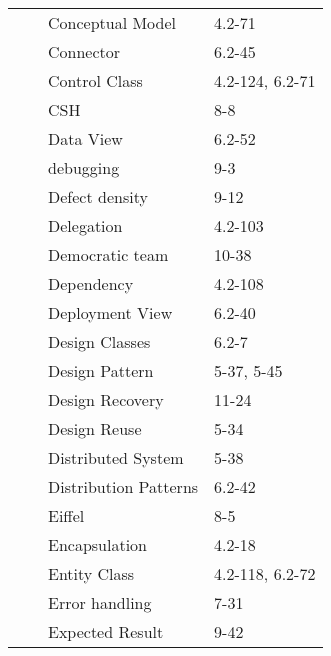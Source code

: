 \documentclass[twocolumn]{article}
\begin{document}
\begin{tabular}{ | >{\bfseries}m{0.5em} | >{\bfseries}m{1em} | m{12em} | m{8em} |}
 &  & Conceptual Model & 4.2-71\\ \cline{3-4}
 &  & Connector & 6.2-45\\ \cline{3-4}
 &  & Control Class & 4.2-124, 6.2-71\\ \cline{3-4}
 &  & CSH & 8-8\\ \cline{2-4}
 & \multirow{13}{1em}{D \newline  \newline  \newline  \newline  \newline D \newline  \newline  \newline  \newline  \newline D} & Data View & 6.2-52\\ \cline{3-4}
 &  & debugging & 9-3\\ \cline{3-4}
 &  & Defect density & 9-12\\ \cline{3-4}
 &  & Delegation & 4.2-103\\ \cline{3-4}
 &  & Democratic team & 10-38\\ \cline{3-4}
 &  & Dependency & 4.2-108\\ \cline{3-4}
 &  & Deployment View & 6.2-40\\ \cline{3-4}
 &  & Design Classes & 6.2-7\\ \cline{3-4}
 &  & Design Pattern & 5-37, 5-45\\ \cline{3-4}
 &  & Design Recovery & 11-24\\ \cline{3-4}
 &  & Design Reuse & 5-34\\ \cline{3-4}
 &  & Distributed System & 5-38\\ \cline{3-4}
 &  & Distribution Patterns & 6.2-42\\ \cline{2-4}
 & \multirow{6}{1em}{E \newline  \newline  \newline  \newline  \newline E} & Eiffel & 8-5\\ \cline{3-4}
 &  & Encapsulation & 4.2-18\\ \cline{3-4}
 &  & Entity Class & 4.2-118, 6.2-72\\ \cline{3-4}
 &  & Error handling & 7-31\\ \cline{3-4}
 &  & Expected Result & 9-42\\ \cline{3-4}

\end{tabular}
\end{document}
